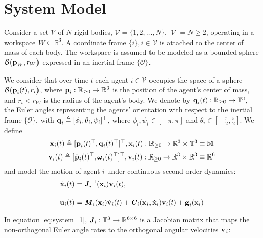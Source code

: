 \section{System Model}

Consider a set $\mathcal{V}$ of $N$ rigid bodies,
$\mathcal{V} = \{ 1,2, \ldots, N\}$, $|\mathcal{V}| = N \geq 2$, operating in
a workspace $W\subseteq \mathbb{R}^3$. A coordinate frame
$\{i\}, i\in\mathcal{V}$ is attached to the center of mass of each body.
The workspace is assumed to be modeled as a
bounded sphere $\mathcal{B}\big(\bm{\mathbf{p}}_W,r_W\big)$ expressed in an inertial frame
$\{\mathcal{O}\}$.

We consider that over time $t$ each agent $i \in \mathcal{V}$ occupies the
space of a sphere $\mathcal{B}\big(\bm{\mathbf{p}}_i(t), r_i\big)$, where
$\bm{\mathbf{p}}_i : \mathbb{R}_{\geq 0} \to \mathbb{R}^3$
is the position of the agent's center of mass, and $r_i < r_W$ is the radius of the
agent's body. We denote by $\bm{\mathbf{q}}_i(t):\mathbb{R}_{\geq 0} \to \mathbb{T}^3$,
the Euler angles representing the agents' orientation with respect to the
inertial frame $\{\mathcal{O}\}$,
with $\bm{\mathbf{q}}_i \triangleq [\phi_i,\theta_i,\psi_i]^{\top}$, where
$\phi_i, \psi_i \in [-\pi, \pi]$ and
$\theta_i \in [-\frac{\pi}{2}, \frac{\pi}{2}]$. We define
$$\bm{\mathbf{x}}_i (t)\triangleq [\bm{\mathbf{p}}_i(t)^{\top},\bm{\mathbf{q}}_i(t)^{\top}]^{\top},
\bm{\mathbf{x}}_i(t):\mathbb{R}_{\geq 0} \to \mathbb{R}^3\times \mathbb{T}^3 \equiv \mathbb{M}$$
$$\bm{\mathbf{v}}_i(t) \triangleq [\dot{\bm{\mathbf{p}}}_i(t)^{\top}, \bm{\mathbf{\omega}}_i(t)^{\top}]^{\top},
\bm{\mathbf{v}}_i(t) : \mathbb{R}_{\geq 0} \to \mathbb{R}^3\times \mathbb{R}^3 \equiv \mathbb{R}^6$$
and model the motion of agent $i$ under continuous second order dynamics:
\begin{subequations}
	\begin{align}
    \dot{\bm{\mathbf{x}}}_i(t) &= \bm{\mathit{J}}_i^{-1}(\bm{\mathbf{x}}_i) \bm{\mathbf{v}}_i(t), \label{eq:system_1} \\[2.5ex]
    \bm{\mathbf{u}}_i(t) &= \bm{\mathit{M}}_i(\bm{\mathbf{x}}_i) \dot{\bm{\mathbf{v}}}_i(t) +
      \bm{\mathit{C}}_i(\bm{\mathbf{x}}_i,\dot{\bm{\mathbf{x}}}_i) \bm{\mathbf{v}}_i(t)+\bm{\mathbf{g}}_i(\bm{\mathbf{x}}_i) \label{eq:system_2}
	\end{align}
  \label{eq:system}
\end{subequations}

In equation \eqref{eq:system_1}, $\bm{\mathit{J}}_i:\mathbb{T}^3 \to \mathbb{R}^{6\times6}$ is
a Jacobian matrix that maps the non-orthogonal Euler angle rates to the
orthogonal angular velocities $\bm{\mathbf{v}}_i$:

